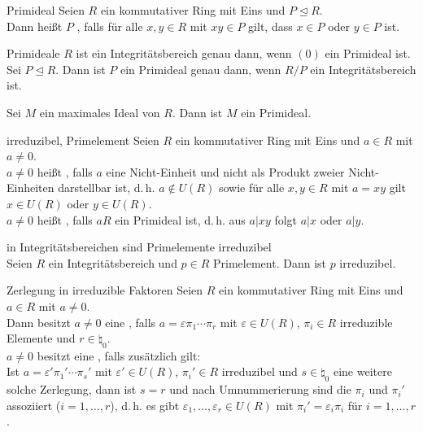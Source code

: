 \begin{Def}{Primideal}
    Seien $R$ ein kommutativer Ring mit Eins und $P \trianglelefteq R$. \\
    Dann heißt $P$ , falls
    für alle $x, y \in R$ mit $xy \in P$ gilt, dass $x \in P$ oder $y \in P$
    ist.
\end{Def}

\begin{Satz}{Primideale}
    $R$ ist ein Integritätsbereich genau dann, wenn $(0)$ ein Primideal ist. \\
    Sei $P \trianglelefteq R$.
    Dann ist $P$ ein Primideal genau dann, wenn $R/P$ ein Integritätsbereich
    ist.
\end{Satz}

\begin{Kor}
    Sei $M$ ein maximales Ideal von $R$.
    Dann ist $M$ ein Primideal.
\end{Kor}

\begin{Def}{irreduzibel, Primelement}
    Seien $R$ ein kommutativer Ring mit Eins und $a \in R$ mit $a \not= 0$. \\
    $a \not= 0$ heißt , falls $a$ eine Nicht-Einheit und
    nicht als Produkt zweier Nicht-Einheiten darstellbar ist,
    d.\,h. $a \notin U(R)$ sowie für alle $x, y \in R$ mit
    $a = xy$ gilt $x \in U(R)$ oder $y \in U(R)$. \\
    $a \not= 0$ heißt , falls $aR$ ein Primideal ist,
    d.\,h. aus $a|xy$ folgt $a|x$ oder $a|y$.
\end{Def}

\begin{Satz}{in Integritätsbereichen sind Primelemente irreduzibel} \\
    Seien $R$ ein Integritätsbereich und $p \in R$ Primelement.
    Dann ist $p$ irreduzibel.
\end{Satz}

\begin{Def}{Zerlegung in irreduzible Faktoren}
    Seien $R$ ein kommutativer Ring mit Eins und $a \in R$ mit $a \not= 0$. \\
    Dann besitzt $a \not= 0$ eine ,
    falls $a = \varepsilon \pi_1 \dotsm \pi_r$ mit $\varepsilon \in U(R)$,
    $\pi_i \in R$ irreduzible Elemente und
    $r \in \natural_0$. \\
    $a \not= 0$ besitzt eine
    ,
    falls zusätzlich gilt: \\
    Ist $a = \varepsilon' \pi_1' \dotsm \pi_s'$
    mit $\varepsilon' \in U(R)$, $\pi_i' \in R$ irreduzibel und
    $s \in \natural_0$ eine weitere solche Zerlegung, dann ist
    $s = r$ und nach Umnummerierung sind die $\pi_i$ und $\pi_i'$ assoziiert
    ($i = 1, \dotsc, r$), d.\,h. es gibt
    $\varepsilon_1, \dotsc, \varepsilon_r \in U(R)$ mit
    $\pi_i' = \varepsilon_i \pi_i$ für $i = 1, \dotsc, r$.
\end{Def}

